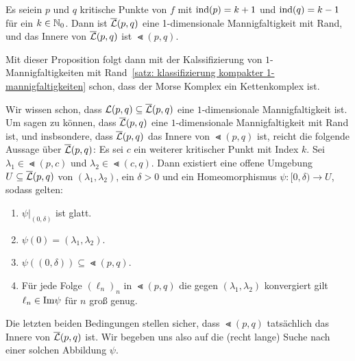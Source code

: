 \begin{prop}
    \label{prop: gebrochene trajektorien sind 1-dim mannigfaltigkeit}
    Es seiein $p$ und $q$ kritische Punkte von $f$ mit ${ \operatorname{ind} } (p) = k + 1$ und ${ \operatorname{ind} } (q) = k - 1$
    für ein $k \in { \mathbb N }_0$. Dann ist ${\overline{\mathcal{L}} } (p, q)$ eine 1-dimensionale Mannigfaltigkeit mit Rand, und das
    Innere von ${\overline{\mathcal{L}} } (p, q)$ ist $\Lt (p, q)$.
\end{prop}

Mit dieser Proposition folgt dann mit der Kalssifizierung von $1$-Mannigfaltigkeiten mit 
Rand~\ref{satz: klassifizierung kompakter 1-mannigfaltigkeiten} schon, dass der Morse Komplex ein
Kettenkomplex ist.

\begin{bigproof}
    Wir wissen schon, dass ${ \mathcal{L} } (p, q) \subseteq {\overline{\mathcal{L}} }(p, q)$ eine $1$-dimensionale Mannigfaltigkeit ist. 
    Um sagen zu können, dass ${\overline{\mathcal{L}} } (p, q)$ eine $1$-dimensionale Mannigfaltigkeit mit Rand ist, und 
    insbsondere, dass ${\overline{\mathcal{L}} } (p, q)$ das Innere von $\Lt(p, q)$ ist, reicht die folgende Aussage über 
    ${\overline{\mathcal{L}} }(p, q)$:
    Es sei $c$ ein weiterer kritischer Punkt mit Index $k$.
    Sei $\lambda_1 \in \Lt (p, c)$ und $\lambda_2 \in \Lt (c, q)$. Dann existiert eine offene Umgebung
    $U \subseteq {\overline{\mathcal{L}} } (p, q)$ von $(\lambda_1, \lambda_2)$, ein $\delta > 0$ und ein Homeomorphismus
    $\psi \colon [0, \delta) \to U$, sodass gelten: 
    \begin{enumerate}
        \item $\psi|_{(0, \delta)}$ ist glatt.
        \item $\psi(0) = (\lambda_1, \lambda_2)$.
        \item $\psi((0, \delta)) \subseteq \Lt (p, q)$.
        \item Für jede Folge $(\ell_n)_n$ in $\Lt (p, q)$ die gegen $(\lambda_1, \lambda_2)$ konvergiert 
            gilt $\ell_n \in { \operatorname{Im} } \psi$ für $n$ groß genug.
    \end{enumerate} 
    Die letzten beiden Bedingungen stellen sicher, dass $\Lt (p, q)$ tatsächlich das Innere von 
    ${\overline{\mathcal{L}} } (p, q)$ ist.
    Wir begeben uns also auf die (recht lange) Suche nach einer solchen Abbildung $\psi$. 


\end{bigproof}
